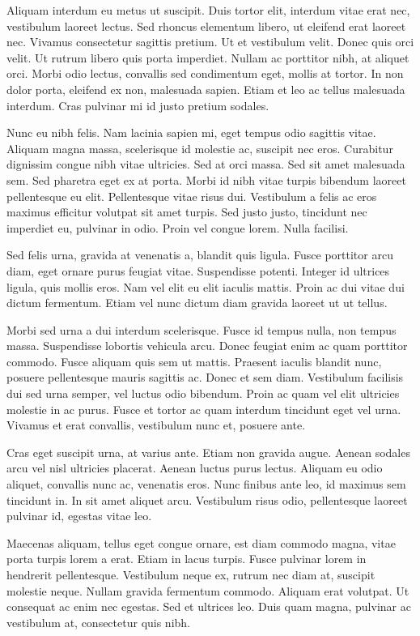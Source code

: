 \documentclass{article}
\begin{document}
Aliquam interdum eu metus ut suscipit. Duis tortor elit, interdum vitae erat nec, vestibulum laoreet lectus. Sed rhoncus elementum libero, ut eleifend erat laoreet nec. Vivamus consectetur sagittis pretium. Ut et vestibulum velit. Donec quis orci velit. Ut rutrum libero quis porta imperdiet. Nullam ac porttitor nibh, at aliquet orci. Morbi odio lectus, convallis sed condimentum eget, mollis at tortor. In non dolor porta, eleifend ex non, malesuada sapien. Etiam et leo ac tellus malesuada interdum. Cras pulvinar mi id justo pretium sodales.

Nunc eu nibh felis. Nam lacinia sapien mi, eget tempus odio sagittis vitae. Aliquam magna massa, scelerisque id molestie ac, suscipit nec eros. Curabitur dignissim congue nibh vitae ultricies. Sed at orci massa. Sed sit amet malesuada sem. Sed pharetra eget ex at porta. Morbi id nibh vitae turpis bibendum laoreet pellentesque eu elit. Pellentesque vitae risus dui. Vestibulum a felis ac eros maximus efficitur volutpat sit amet turpis. Sed justo justo, tincidunt nec imperdiet eu, pulvinar in odio. Proin vel congue lorem. Nulla facilisi.

Sed felis urna, gravida at venenatis a, blandit quis ligula. Fusce porttitor arcu diam, eget ornare purus feugiat vitae. Suspendisse potenti. Integer id ultrices ligula, quis mollis eros. Nam vel elit eu elit iaculis mattis. Proin ac dui vitae dui dictum fermentum. Etiam vel nunc dictum diam gravida laoreet ut ut tellus.

Morbi sed urna a dui interdum scelerisque. Fusce id tempus nulla, non tempus massa. Suspendisse lobortis vehicula arcu. Donec feugiat enim ac quam porttitor commodo. Fusce aliquam quis sem ut mattis. Praesent iaculis blandit nunc, posuere pellentesque mauris sagittis ac. Donec et sem diam. Vestibulum facilisis dui sed urna semper, vel luctus odio bibendum. Proin ac quam vel elit ultricies molestie in ac purus. Fusce et tortor ac quam interdum tincidunt eget vel urna. Vivamus et erat convallis, vestibulum nunc et, posuere ante.

Cras eget suscipit urna, at varius ante. Etiam non gravida augue. Aenean sodales arcu vel nisl ultricies placerat. Aenean luctus purus lectus. Aliquam eu odio aliquet, convallis nunc ac, venenatis eros. Nunc finibus ante leo, id maximus sem tincidunt in. In sit amet aliquet arcu. Vestibulum risus odio, pellentesque laoreet pulvinar id, egestas vitae leo.

Maecenas aliquam, tellus eget congue ornare, est diam commodo magna, vitae porta turpis lorem a erat. Etiam in lacus turpis. Fusce pulvinar lorem in hendrerit pellentesque. Vestibulum neque ex, rutrum nec diam at, suscipit molestie neque. Nullam gravida fermentum commodo. Aliquam erat volutpat. Ut consequat ac enim nec egestas. Sed et ultrices leo. Duis quam magna, pulvinar ac vestibulum at, consectetur quis nibh.
\end{document}
